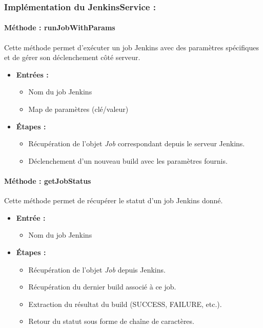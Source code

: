 \subsubsection*{Implémentation du JenkinsService :}

\paragraph{Méthode : runJobWithParams}

Cette méthode permet d’exécuter un job Jenkins avec des paramètres spécifiques et de gérer son déclenchement côté serveur.

\begin{itemize}
    \item \textbf{Entrées :}
    \begin{itemize}
        \item Nom du job Jenkins
        \item Map de paramètres (clé/valeur)
    \end{itemize}

    \item \textbf{Étapes :}
    \begin{itemize}
        \item Récupération de l’objet \textit{Job} correspondant depuis le serveur Jenkins.
        \item Déclenchement d’un nouveau build avec les paramètres fournis.
    \end{itemize}
\end{itemize}

\paragraph{Méthode : getJobStatus}

Cette méthode permet de récupérer le statut d’un job Jenkins donné.

\begin{itemize}
    \item \textbf{Entrée :}
    \begin{itemize}
        \item Nom du job Jenkins
    \end{itemize}

    \item \textbf{Étapes :}
    \begin{itemize}
        \item Récupération de l’objet \textit{Job} depuis Jenkins.
        \item Récupération du dernier build associé à ce job.
        \item Extraction du résultat du build (SUCCESS, FAILURE, etc.).
        \item Retour du statut sous forme de chaîne de caractères.
    \end{itemize}
\end{itemize}

